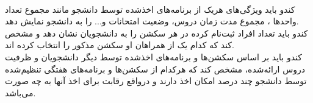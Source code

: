\documentclass{report}
\begin{document}
\begin{adjustwidth}{2em}{0pt}
\\                                                                                                                                                                                                                          کندو باید ویژگی‌های هریک از برنامه‌های اخذشده توسط دانشجو مانند مجموع تعداد واحدها ، مجموع مدت زمان دروس، وضعیت امتحانات و... را به دانشجو نمایش دهد.                                                                                                                                                                                                    \\                                                                                                                                                                                                                         کندو باید تعداد افراد ثبت‌نام کرده در هر سکشن را به دانشجویان نشان دهد و مشخص کند که کدام یک از همراهان او سکشن مذکور را انتخاب کرده اند.                                                                                                                                                                                                                          \\                                                                                                                                                                                                                          کندو باید بر اساس سکشن‌ها و برنامه‌های اخذشده توسط دیگر دانشجویان و ظرفیت دروس ارائه‌شده، مشخص کند که هرکدام از سکشن‌ها و برنامه‌های هفتگی تنظیم‌شده توسط دانشجو چند درصد امکان اخذ دارند و درواقع رقابت برای اخذ آنها به چه صورت می‌باشد.                                                                                                                                                                                 \end{adjustwidth} 
\end{document}
